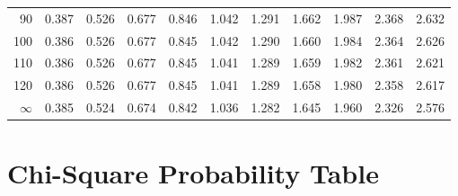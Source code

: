 \begin{center}
\begin{tabular}{|r|*{10}{r}|}
90 & 0.387 & 0.526 & 0.677 & 0.846 & 1.042 & 1.291 & 1.662 & 1.987 & 2.368 & 2.632 \\ 
100 & 0.386 & 0.526 & 0.677 & 0.845 & 1.042 & 1.290 & 1.660 & 1.984 & 2.364 & 2.626 \\ 
110 & 0.386 & 0.526 & 0.677 & 0.845 & 1.041 & 1.289 & 1.659 & 1.982 & 2.361 & 2.621 \\ 
120 & 0.386 & 0.526 & 0.677 & 0.845 & 1.041 & 1.289 & 1.658 & 1.980 &
2.358 & 2.617 \\
$\infty$ & 0.385 & 0.524 & 0.674 & 0.842 & 1.036 & 1.282 & 1.645 & 1.960 & 2.326 & 2.576\\ 
\hline
  \end{tabular}
\end{center}
\newpage 

\section{Chi-Square Probability Table}
\label{chiSquareProbabilityTable}


